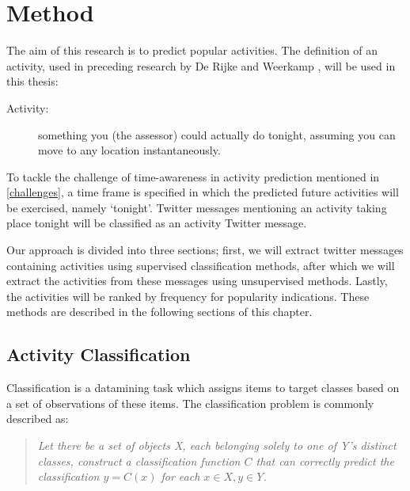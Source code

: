 
\chapter{Method} %

\label{ch:method} %





The aim of this research is to predict popular activities. The definition of an activity, used in preceding research by De Rijke and Weerkamp \cite{Weerkamp}, will be used in this thesis:
\begin{description}
\item[Activity:] something you (the assessor) could actually do tonight, assuming you can move to any location instantaneously.
\end{description}

To tackle the challenge of time-awareness in activity prediction mentioned in \autoref{challenges}, a time frame is specified in which the predicted future activities will be exercised, namely `tonight'. Twitter messages mentioning an activity taking place tonight will be classified as an activity Twitter message.


Our approach is divided into three sections; first, we will extract twitter messages containing activities using supervised classification methods, after which we will extract the activities from these messages using unsupervised methods. Lastly, the activities will be ranked by frequency for popularity indications. These methods are described in the following sections of this chapter.



\section{Activity Classification}
Classification is a datamining task which assigns items to target classes based on a set of observations of these items. The classification problem is commonly described as: \begin{quotation} \noindent \textit{Let there be a set of objects X, each belonging solely to one of Y's distinct classes, construct a classification function $C$ that can correctly predict the classification $y = C(x)$ for each $x\in X, y \in Y$.}
\end{quotation}

